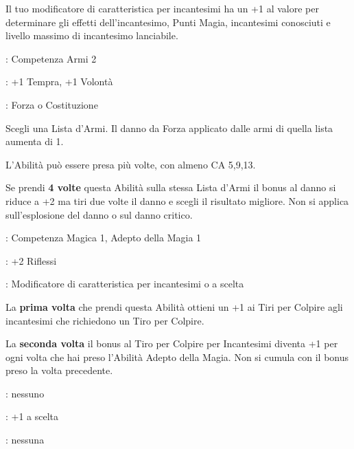\begin{multicols}{2}
Il tuo modificatore di caratteristica per incantesimi ha un +1 al valore per determinare gli effetti dell'incantesimo, Punti Magia, incantesimi conosciuti e livello massimo di incantesimo lanciabile.

\begin{description}[noitemsep, topsep=0pt, parsep=0pt, partopsep=0pt, leftmargin=0cm, labelwidth=2.5cm]
    \item[\textbf{Requisito}]: Competenza Armi 2
    \item[\textbf{Tiri Salvezza}]: +1 Tempra, +1 Volontà
    \item[\textbf{Caratteristica}]: Forza o Costituzione
\end{description}

Scegli una Lista d'Armi. Il danno da Forza applicato dalle armi di quella lista aumenta di 1.

L’Abilità può essere presa più volte, con almeno CA 5,9,13.

Se prendi \textbf{4 volte} questa Abilità sulla stessa Lista d'Armi il bonus al danno si riduce a +2 ma tiri due volte il danno e scegli il risultato migliore. Non si applica sull'esplosione del danno o sul danno critico.

\begin{description}[noitemsep, topsep=0pt, parsep=0pt, partopsep=0pt, leftmargin=0cm, labelwidth=2.5cm]
    \item[\textbf{Requisito}]: Competenza Magica 1, Adepto della Magia 1
    \item[\textbf{Tiri Salvezza}]: +2 Riflessi
    \item[\textbf{Caratteristica}]: Modificatore di caratteristica per incantesimi o a scelta
\end{description}

La \textbf{prima volta} che prendi questa Abilità ottieni un +1 ai Tiri per Colpire agli incantesimi che richiedono un Tiro per Colpire.

La \textbf{seconda volta} il bonus al Tiro per Colpire per Incantesimi diventa +1 per ogni volta che hai preso l'Abilità Adepto della Magia. Non si cumula con il bonus preso la volta precedente.

\begin{description}[noitemsep, topsep=0pt, parsep=0pt, partopsep=0pt, leftmargin=0cm, labelwidth=2.5cm]
    \item[\textbf{Requisito}]: nessuno
    \item[\textbf{Tiri Salvezza}]:  +1 a scelta
    \item[\textbf{Caratteristica}]: nessuna
\end{description}


\end{multicols}
